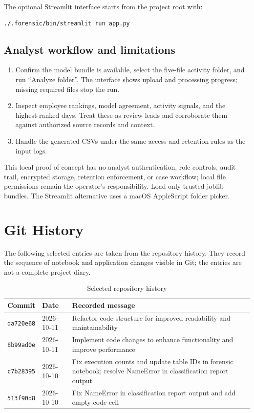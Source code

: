 \documentclass[12pt,a4paper,oneside]{report}
\begin{document}
The optional Streamlit interface starts from the project root with:
\begin{lstlisting}
./.forensic/bin/streamlit run app.py
\end{lstlisting}

\section{Analyst workflow and limitations}
\begin{enumerate}
  \item Confirm the model bundle is available, select the five-file
        activity folder, and run ``Analyze folder''. The interface shows
        upload and processing progress; missing required files stop the run.
  \item Inspect employee rankings, model agreement, activity signals,
        and the highest-ranked days. Treat these as review leads and
        corroborate them against authorized source records and context.
  \item Handle the generated CSVs under the same access and retention
        rules as the input logs.
\end{enumerate}

This local proof of concept has no analyst authentication, role controls,
audit trail, encrypted storage, retention enforcement, or case workflow;
local file permissions remain the operator's responsibility. Load only
trusted joblib bundles. The Streamlit alternative uses a macOS
AppleScript folder picker.

\chapter{Git History}
The following selected entries are taken from the repository history.
They record the sequence of notebook and application changes visible in
Git; the entries are not a complete project diary.

\begin{table}[!htbp]
\centering
\caption{Selected repository history}
\label{tab:git-history}
\begin{tabularx}{\textwidth}{|p{}|p{}|X|}
\hline
Commit & Date & Recorded message\\
\hline
\texttt{da720e68} & 2026-10-11 & Refactor code structure for improved readability and maintainability\\
\hline
\texttt{8b99ad0e} & 2026-10-11 & Implement code changes to enhance functionality and improve performance\\
\hline
\texttt{c7b28395} & 2026-10-10 & Fix execution counts and update table IDs in forensic notebook; resolve NameError in classification report output\\
\hline
\texttt{513f90d8} & 2026-10-10 & Fix NameError in classification report output and add empty code cell\\
\hline
\end{tabularx}
\end{table}
\end{document}
